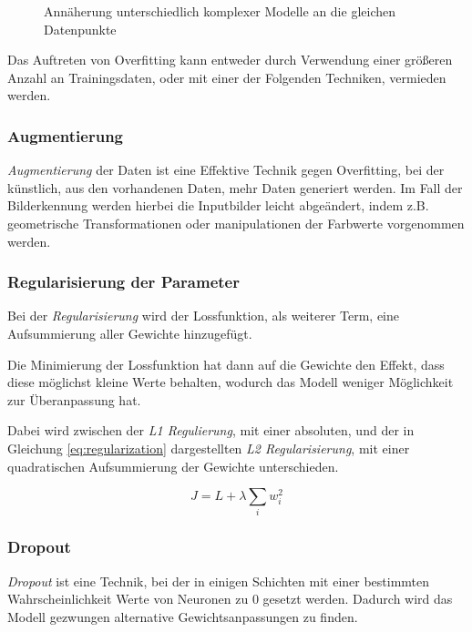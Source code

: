 \vspace{1cm}
\begin{figure}[H]
    \centering
    \def\svgwidth{\textwidth}
    
    \caption{Annäherung unterschiedlich komplexer Modelle an die gleichen 
        Datenpunkte}
    \label{fig:over_under_fit}
\end{figure}
\vspace{1cm}

Das Auftreten von Overfitting kann entweder durch 
Verwendung einer größeren Anzahl an Trainingsdaten, 
oder mit einer der Folgenden Techniken, vermieden werden.


\subsubsection{Augmentierung}

\textit{Augmentierung} der Daten ist eine Effektive Technik 
gegen Overfitting, bei der künstlich,
aus den vorhandenen Daten, mehr Daten generiert werden. 
Im Fall der Bilderkennung werden hierbei 
die Inputbilder leicht abgeändert, indem z.B. geometrische 
Transformationen oder manipulationen der Farbwerte 
vorgenommen werden.


\subsubsection{Regularisierung der Parameter}

Bei der \textit{Regularisierung} wird der Lossfunktion, als weiterer Term,
eine Aufsummierung aller Gewichte hinzugefügt.

Die Minimierung der Lossfunktion hat dann auf 
die Gewichte den Effekt, dass diese möglichst 
kleine Werte behalten, wodurch das Modell weniger
Möglichkeit zur Überanpassung hat.


Dabei wird zwischen der \textit{L1 Regulierung}, mit einer
absoluten, und der in Gleichung \ref{eq:regularization}
dargestellten \textit{L2 Regularisierung}, mit einer 
quadratischen Aufsummierung der
Gewichte unterschieden.

\begin{equation}
    \label{eq:regularization}
    J = L + \lambda \sum_{i} w_{i}^{2}
\end{equation}


\subsubsection{Dropout}
\textit{Dropout} ist eine Technik, bei der in einigen Schichten 
mit einer bestimmten Wahrscheinlichkeit Werte von 
Neuronen zu 0 gesetzt werden.
Dadurch wird das Modell gezwungen alternative
Gewichtsanpassungen zu finden.


